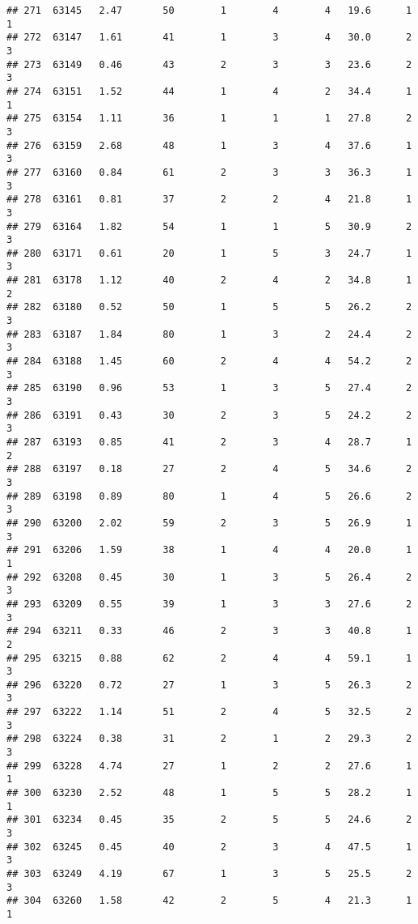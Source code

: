 \documentclass[
]{article}
\begin{document}
\begin{verbatim}
## 271  63145   2.47       50        1        4        4   19.6      1      1
## 272  63147   1.61       41        1        3        4   30.0      2      3
## 273  63149   0.46       43        2        3        3   23.6      2      3
## 274  63151   1.52       44        1        4        2   34.4      1      1
## 275  63154   1.11       36        1        1        1   27.8      2      3
## 276  63159   2.68       48        1        3        4   37.6      1      3
## 277  63160   0.84       61        2        3        3   36.3      1      3
## 278  63161   0.81       37        2        2        4   21.8      1      3
## 279  63164   1.82       54        1        1        5   30.9      2      3
## 280  63171   0.61       20        1        5        3   24.7      1      3
## 281  63178   1.12       40        2        4        2   34.8      1      2
## 282  63180   0.52       50        1        5        5   26.2      2      3
## 283  63187   1.84       80        1        3        2   24.4      2      3
## 284  63188   1.45       60        2        4        4   54.2      2      3
## 285  63190   0.96       53        1        3        5   27.4      2      3
## 286  63191   0.43       30        2        3        5   24.2      2      3
## 287  63193   0.85       41        2        3        4   28.7      1      2
## 288  63197   0.18       27        2        4        5   34.6      2      3
## 289  63198   0.89       80        1        4        5   26.6      2      3
## 290  63200   2.02       59        2        3        5   26.9      1      3
## 291  63206   1.59       38        1        4        4   20.0      1      1
## 292  63208   0.45       30        1        3        5   26.4      2      3
## 293  63209   0.55       39        1        3        3   27.6      2      3
## 294  63211   0.33       46        2        3        3   40.8      1      2
## 295  63215   0.88       62        2        4        4   59.1      1      3
## 296  63220   0.72       27        1        3        5   26.3      2      3
## 297  63222   1.14       51        2        4        5   32.5      2      3
## 298  63224   0.38       31        2        1        2   29.3      2      3
## 299  63228   4.74       27        1        2        2   27.6      1      1
## 300  63230   2.52       48        1        5        5   28.2      1      1
## 301  63234   0.45       35        2        5        5   24.6      2      3
## 302  63245   0.45       40        2        3        4   47.5      1      3
## 303  63249   4.19       67        1        3        5   25.5      2      3
## 304  63260   1.58       42        2        5        4   21.3      1      1

\end{verbatim}
\end{document}
